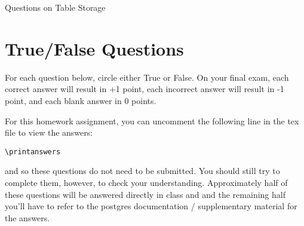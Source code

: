 \documentclass{exam}
\theoremstyle{definition}
\begin{document}
\begin{center}
\Huge
Questions on Table Storage
\end{center}


\section{True/False Questions}

For each question below, circle either True or False.
On your final exam,
each correct answer will result in +1 point,
each incorrect answer will result in -1 point,
and each blank answer in 0 points.

\vspace{0.15in}
\noindent
For this homework assignment, you can uncomment the following line in the tex file to view the answers:
\begin{verbatim}
\printanswers
\end{verbatim}
and so these questions do not need to be submitted.
You should still try to complete them, however, to check your understanding.
Approximately half of these questions will be answered directly in class and 
and the remaining half you'll have to refer to the postgres documentation / supplementary material for the answers.
\end{document}
